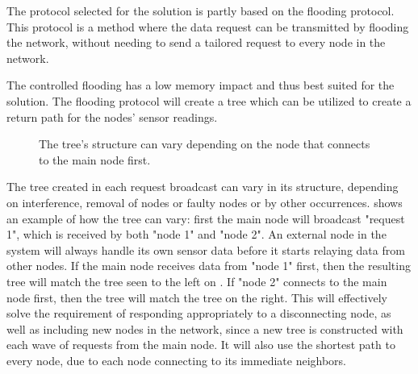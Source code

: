 The protocol selected for the solution is partly based on the flooding protocol.
This protocol is a method where the data request can be transmitted by flooding the network, without needing to send a tailored request to every node in the network. 

The controlled flooding has a low memory impact and thus best suited for the solution. The flooding protocol will create a tree which can be utilized to create a return path for the nodes' sensor readings.

\begin{figure}[h!]
	\centering
	\caption{The tree's structure can vary depending on the node that connects to the main node first.}
	\label{fig:treeVariation}
\end{figure}


The tree created in each request broadcast can vary in its structure, depending on interference, removal of nodes or faulty nodes or by other occurrences.  shows an example of how the tree can vary: first the main node will broadcast "request 1", which is received by both "node 1" and "node 2". An external node in the system will always handle its own sensor data before it starts relaying data from other nodes. If the main node receives data from "node 1" first, then the resulting tree will match the tree seen to the left on . If "node 2" connects to the main node first, then the tree will match the tree on the right.
This will effectively solve the requirement of responding appropriately to a disconnecting node, as well as including new nodes in the network, since a new tree is constructed with each wave of requests from the main node.
It will also use the shortest path to every node, due to each node connecting to its immediate neighbors.

